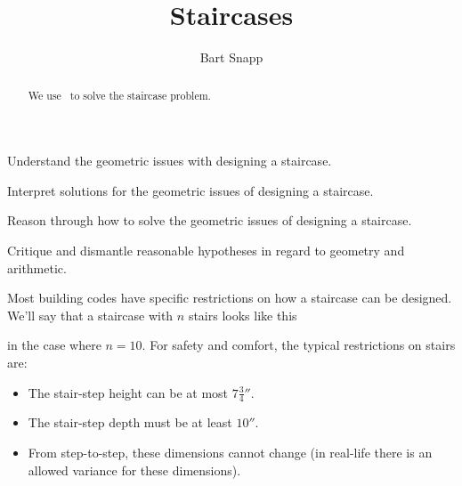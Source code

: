 \documentclass[noauthor,nooutcomes,12pt,handout]{ximera}
\title{Staircases}
\author{Bart Snapp}
\begin{document}
\begin{abstract}
  We use \snap\ to solve the staircase problem.
\end{abstract}
\maketitle

\begin{listOutcomes}
\item{Understand the geometric issues with designing a staircase.}
\item{Interpret solutions for the geometric issues of designing a staircase.}
\item{Reason through how to solve the geometric issues of designing a staircase.}
\item{Critique and dismantle reasonable hypotheses in regard to geometry and arithmetic.}
\end{listOutcomes}



Most building codes have specific restrictions on how a staircase
can be designed. We'll say that a staircase with $n$ stairs looks like this
\begin{center}
\end{center}
in the case where $n=10$. For safety and comfort, the typical
restrictions on stairs are:
\begin{itemize}
\item The stair-step height can be at most $7\frac{3}{4}''$. 
\item The stair-step depth must be at least $10''$.
\item From step-to-step, these dimensions cannot change (in real-life there is
an allowed variance for these dimensions).
\end{itemize}
\end{document}
